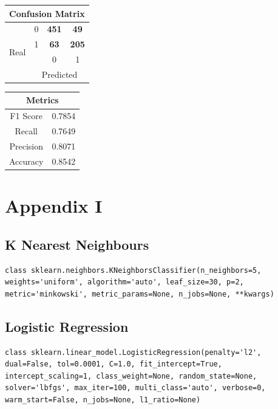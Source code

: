 \documentclass[12pt]{article}
\begin{document}
\begin{table}[]
\centering
\begin{tabular}{|c|c|c|c|}
\hline
\multicolumn{4}{|c|}{Confusion Matrix}                  \\ \hline
\multirow{4}{*}{Real} & 0 & \textbf{451} & \textbf{49}  \\ \cline{2-4} 
                      & 1 & \textbf{63}  & \textbf{205} \\ \cline{2-4} 
                      &   & 0            & 1            \\ \cline{2-4} 
                      & \multicolumn{3}{c|}{Predicted}  \\ \hline
\end{tabular}
\label{table:14}
\end{table}

\begin{table}[]
\centering
\begin{tabular}{|c|c|}
\hline
\multicolumn{2}{|c|}{Metrics} \\ \hline
F1 Score        & 0.7854      \\ \hline
Recall          & 0.7649      \\ \hline
Precision       & 0.8071      \\ \hline
Accuracy        & 0.8542      \\ \hline
\end{tabular}
\label{table:15}
\end{table}




\newpage
\clearpage

\section{Appendix I}
\subsection{K Nearest Neighbours}
\begin{lstlisting}
class sklearn.neighbors.KNeighborsClassifier(n_neighbors=5, weights='uniform', algorithm='auto', leaf_size=30, p=2, metric='minkowski', metric_params=None, n_jobs=None, **kwargs)
\end{lstlisting}

\subsection{Logistic Regression}
\begin{lstlisting}
class sklearn.linear_model.LogisticRegression(penalty='l2', dual=False, tol=0.0001, C=1.0, fit_intercept=True, intercept_scaling=1, class_weight=None, random_state=None, solver='lbfgs', max_iter=100, multi_class='auto', verbose=0, warm_start=False, n_jobs=None, l1_ratio=None)
\end{lstlisting}
\end{document}
